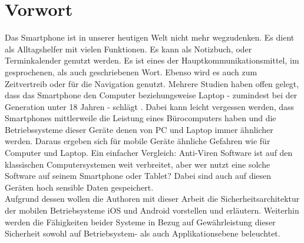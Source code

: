 \section{Vorwort}
	Das Smartphone ist in unserer heutigen Welt nicht mehr wegzudenken. Es dient
	als Alltagshelfer mit vielen Funktionen. Es kann als Notizbuch, oder
	Terminkalender genutzt werden. Es ist eines der Hauptkommunikationsmittel, im
	gesprochenen, als auch geschriebenen Wort. Ebenso wird es auch zum
	Zeitvertreib oder für die Navigation genutzt. Mehrere Studien haben offen 
	gelegt, dass das Smartphone den Computer beziehungsweise Laptop - zumindest
	bei der Generation unter 18 Jahren - schlägt
	\cite{BitkomStudieJugend2014}
	\cite{MPFSStudie2013}.
	Dabei kann leicht vergessen werden, dass Smartphones mittlerweile die Leistung
	eines Bürocomputers haben und die Betriebssysteme dieser Geräte denen von PC
	und Laptop immer ähnlicher werden. Daraus ergeben sich für mobile Geräte
	ähnliche Gefahren wie für Computer und Laptop. Ein einfacher Vergleich: Anti-Viren Software ist auf den klassischen Computersystemen weit verbreitet, aber wer nutzt eine solche Software auf
	seinem Smartphone oder Tablet? Dabei sind auch auf diesen Geräten hoch
	sensible Daten gespeichert.\\
	Aufgrund dessen wollen die Authoren mit dieser Arbeit die
	Sicherheitsarchitektur der mobilen Betriebsysteme iOS und Android vorstellen
	und erläutern. Weiterhin werden die Fähigkeiten beider Systeme in Bezug auf
	Gewährleistung dieser Sicherheit sowohl auf Betriebsystem- als auch
	Applikationsebene beleuchtet.
